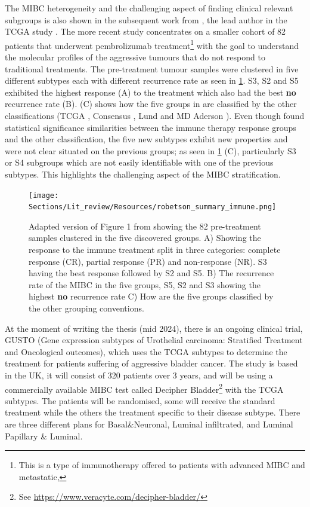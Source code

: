 The MIBC heterogeneity and the challenging aspect of finding clinical relevant subgroups is also shown in the subsequent work from \citet{Robertson2023-na}, the lead author in the TCGA study \cite{Robertson2017-mg}. The more recent study concentrates on a smaller cohort of 82 patients that underwent pembrolizumab treatment\footnote{This is a type of immunotherapy offered to patients with advanced MIBC and metastatic,} with the goal to understand the molecular profiles of the aggressive tumours that do not respond to traditional treatments. The pre-treatment tumour samples were clustered in five different subtypes each with different recurrence rate as seen in \cref{fig:lit:immune_rob}. S3, S2 and S5 exhibited the highest response (A) to the treatment which also had the best \textbf{no} recurrence rate (B).  (C) shows how the five groups in \cite{Robertson2023-na} are classified by the other classifications (TCGA \cite{Robertson2017-mg}, Consensus \cite{Kamoun2020-tj}, Lund \cite{Marzouka2018-ge} and MD Aderson \cite{Dadhania2016-cb}). Even though \citet{Robertson2023-na} found statistical significance similarities between the immune therapy response groups and the other classification, the five new subtypes exhibit new properties and were not clear situated on the previous groups; as seen in \cref{fig:lit:immune_rob} (C), particularly S3 or S4 subgroups which are not easily identifiable with one of the previous subtypes. This highlights the challenging aspect of the MIBC stratification.


\begin{figure}[!b]    
    \centering
\texttt{[image: Sections/Lit\_review/Resources/robetson\_summary\_immune.png]}
    \caption{Adapted version of Figure 1 from \cite{Robertson2023-na} showing the 82 pre-treatment samples clustered in the five discovered groups. A) Showing the response to the immune treatment split in three categories: complete response (CR), partial response (PR) and non-response (NR). S3 having the best response followed by S2 and S5. B) The recurrence rate of the MIBC in the five groups, S5, S2 and S3 showing the highest \textbf{no} recurrence rate C) How are the five groups classified by the other grouping conventions.}
    \label{fig:lit:immune_rob}
\end{figure}


At the moment of writing the thesis (mid 2024), there is an ongoing clinical trial, GUSTO (Gene expression subtypes of Urothelial carcinoma: Stratified Treatment and Oncological outcomes), which uses the TCGA subtypes to determine the treatment for patients suffering of aggressive bladder cancer. The study is based in the UK, it will consist of 320 patients over 3 years, and will be using a commercially available MIBC test called Decipher Bladder\footnote{See \url{https://www.veracyte.com/decipher-bladder/}} with the TCGA subtypes\cite{Griffin2024-zr}. The patients will be randomised, some will receive the standard treatment while the others the treatment specific to their disease subtype. There are three different plans for Basal\&Neuronal, Luminal infiltrated, and Luminal Papillary \& Luminal.

